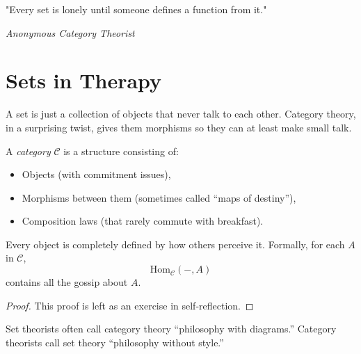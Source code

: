\epigraph{"Every set is lonely until someone defines a function from it."}{\textit{Anonymous Category Theorist}}

\section{Sets in Therapy}
A set is just a collection of objects that never talk to each other. 
Category theory, in a surprising twist, gives them morphisms so they can at least make small talk.

\begin{definition}
A \emph{category} $\mathcal{C}$ is a structure consisting of:
\begin{itemize}
    \item Objects (with commitment issues),
    \item Morphisms between them (sometimes called ``maps of destiny''),
    \item Composition laws (that rarely commute with breakfast).
\end{itemize}
\end{definition}

\begin{theorem}
Every object is completely defined by how others perceive it. 
Formally, for each $A$ in $\mathcal{C}$,
\[
\mathrm{Hom}_{\mathcal{C}}(-,A)
\]
contains all the gossip about $A$.
\end{theorem}

\begin{proof}
This proof is left as an exercise in self-reflection.
\end{proof}

\begin{remark}
Set theorists often call category theory “philosophy with diagrams.” 
Category theorists call set theory “philosophy without style.”
\end{remark}
